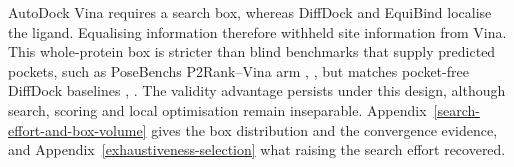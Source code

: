 AutoDock Vina requires a search box, whereas DiffDock and EquiBind localise the ligand. Equalising information therefore withheld site information from Vina. This whole-protein box is stricter than blind benchmarks that supply predicted pockets, such as PoseBench\textquotesingle s P2Rank--Vina arm \cite{ref069}, \cite{ref061}, but matches pocket-free DiffDock baselines \cite{ref024}, \cite{ref091}. The validity advantage persists under this design, although search, scoring and local optimisation remain inseparable. Appendix~\ref{search-effort-and-box-volume} gives the box distribution and the convergence evidence, and Appendix~\ref{exhaustiveness-selection} what raising the search effort recovered.
